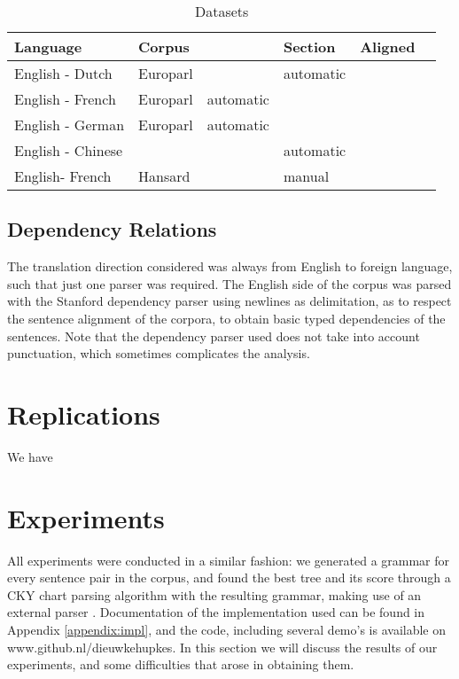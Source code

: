 \documentclass{report}
\begin{document}
\begin{table}
\begin{tabular}{llllll}
Language & Corpus & & Section & Aligned\\
\hline
English - Dutch & Europarl & & automatic \\
English - French & Europarl & automatic \\
English - German & Europarl & automatic \\
English - Chinese & & & automatic \\
English- French & Hansard & & manual\\
\end{tabular}
\caption{Datasets}\label{tab:datasets}
\end{table}

\subsection{Dependency Relations}

The translation direction considered was always from English to foreign language, such that just one parser was required. The English side of the corpus was parsed with the Stanford dependency parser \citep{de2008stanford} using newlines as delimitation, as to respect the sentence alignment of the corpora, to obtain basic typed dependencies of the sentences. Note that the dependency parser used does not take into account punctuation, which sometimes complicates the analysis.


\section{Replications}

We have

\section{Experiments}

All experiments were conducted in a similar fashion: we generated a grammar for every sentence pair in the corpus, and found the best tree and its score through a CKY chart parsing algorithm with the resulting grammar, making use of an external parser \citep{birch2010lrscore}. Documentation of the implementation used can be found in Appendix \ref{appendix:impl}, and the code, including several demo's is available on www.github.nl/dieuwkehupkes. In this section we will discuss the results of our experiments, and some difficulties that arose in obtaining them.
\end{document}
